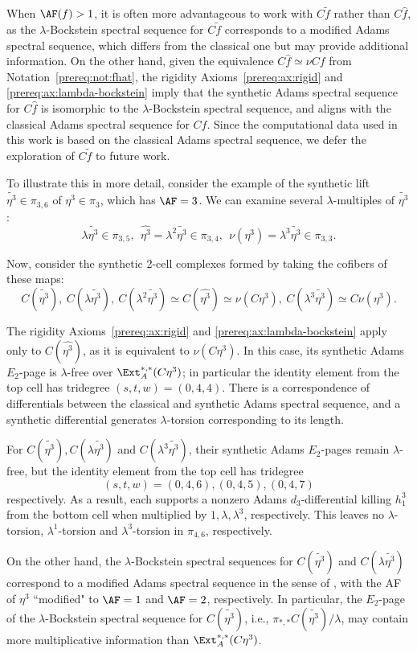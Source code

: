 \begin{remark}
    When $\AF(f)>1$, it is often more advantageous to work with $C\tilde f$ rather than $C\hat f$, as the $\lambda$-Bockstein spectral sequence for $C\tilde f$ corresponds to a modified Adams spectral sequence, which differs from the classical one but may provide additional information. On the other hand, given the equivalence  $C\hat{f}\simeq \nu Cf$ from Notation~\ref{prereq:not:fhat}, the rigidity Axioms~\ref{prereq:ax:rigid} and \ref{prereq:ax:lambda-bockstein} imply that the synthetic Adams spectral sequence for $C\hat f$ is isomorphic to the $\lambda$-Bockstein spectral sequence, and aligns with the classical Adams spectral sequence for $Cf$.  Since the computational data used in this work is based on the classical Adams spectral sequence, we defer the exploration of $C\tilde f$ to future work.

    To illustrate this in more detail, consider the example of the synthetic lift $\tilde{\eta^3} \in \pi_{3,6}$ of $\eta^3 \in \pi_3$, which has $\AF = 3$. We can examine several $\lambda$-multiples of $\tilde{\eta^3}$:
    $$\lambda \tilde{\eta^3} \in \pi_{3,5}, \ \ \hat{\eta^3} = \lambda^2 \tilde{\eta^3} \in \pi_{3,4}, \ \ \nu(\eta^3) = \lambda^3 \tilde{\eta^3} \in \pi_{3,3}.$$

   Now, consider the synthetic 2-cell complexes formed by taking the cofibers of these maps:
    $$C(\tilde{\eta^3}), \ C(\lambda\tilde{\eta^3}), \ C(\lambda^2\tilde{\eta^3}) \simeq C(\hat{\eta^3}) \simeq \nu (C\eta^3), \ C(\lambda^3\tilde{\eta^3}) \simeq C\nu(\eta^3).$$

    The rigidity Axioms~\ref{prereq:ax:rigid} and \ref{prereq:ax:lambda-bockstein} apply only to $C(\hat{\eta^3})$, as it is equivalent to $\nu (C\eta^3)$. In this case, its synthetic Adams $E_2$-page is $\lambda$-free over $\Ext_A^{*,*}(C\eta^3)$; in particular the identity element from the top cell has tridegree $(s,t,w) = (0,4,4)$. There is a correspondence of differentials between the classical and synthetic Adams spectral sequence, and a synthetic differential generates $\lambda$-torsion corresponding to its length.

    For $C(\tilde{\eta^3}), C(\lambda\tilde{\eta^3})$ and $C(\lambda^3\tilde{\eta^3})$, their synthetic Adams $E_2$-pages remain $\lambda$-free, but the identity element from the top cell has tridegree
    $$(s,t,w) =(0,4,6), (0,4,5), (0,4,7)$$
    respectively. As a result, each supports a nonzero Adams $d_3$-differential killing $h_1^3$ from the bottom cell when multiplied by $1, \lambda, \lambda^3$, respectively. This leaves no $\lambda$-torsion, $\lambda^1$-torsion and $\lambda^3$-torsion in $\pi_{4,6}$, respectively.

    On the other hand, the $\lambda$-Bockstein spectral sequences for $C(\tilde{\eta^3})$ and $ C(\lambda\tilde{\eta^3})$ correspond to a modified Adams spectral sequence in the sense of \cite[Section 3]{BHHM}, with the AF of $\eta^3$ ``modified" to $\AF=1$ and $\AF=2$, respectively. In particular, the $E_2$-page of the $\lambda$-Bockstein spectral sequence for $C(\tilde{\eta^3})$, i.e., $\pi_{*,*}C(\tilde{\eta^3})/\lambda$, may contain more multiplicative information than $\Ext_A^{*,*}(C\eta^3)$.


\end{remark}
